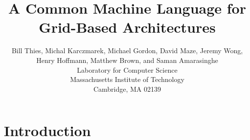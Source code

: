 \documentclass{sig-alternate}
\begin{document}
\title{A Common Machine Language for Grid-Based Architectures}


\author{
\alignauthor \vspace{-18pt}
Bill Thies, 
Michal Karczmarek, 
Michael Gordon, 
David Maze, 
Jeremy Wong,
Henry Hoffmann, 
Matthew Brown, 
and Saman Amarasinghe\\
	\vspace{6pt}
	Laboratory for Computer Science \\
	Massachusetts Institute of Technology \\
	Cambridge, MA  02139 \\
}

\newcommand{\ma}[2]{max_{#1 \rightarrow #2}}
\newcommand{\mi}[2]{\textsc{sdep}_{#2 \small{\rightarrow} #1}}
\newcommand{\floor}[2]{\left\lfloor\frac{#1}{#2}\right\rfloor}
\newcommand{\ceil}[2]{\left\lceil\frac{#1}{#2}\right\rceil}
\newcommand{\ra}[0]{\rightarrow}
\newcommand{\la}[0]{\lambda}

\def\fn#1{\mathop{\mbox{\it #1}}}
\def\fun#1#2{\ensuremath{\mathop{\mbox{\it #1}}(#2)}} %

\newtheorem{definition}{Definition}
\newtheorem{theorem}{Theorem}

\maketitle


\section{Introduction}
\end{document}
